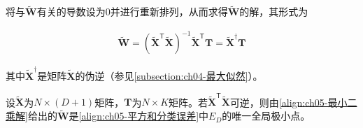 \documentclass[../../main.tex]{subfiles}
\begin{document}
将与$\tilde{\boldsymbol{W}}$有关的导数设为0并进行重新排列，从而求得$\tilde{\boldsymbol{W}}$的解，其形式为

\begin{align}
  \tilde{\boldsymbol{W}}=(\tilde{\boldsymbol{X}}^{\mathsf{T}}\tilde{\boldsymbol{X}})^{-1}\tilde{\boldsymbol{X}}^{\mathsf{T}}\boldsymbol{T}=\tilde{\boldsymbol{X}}^{\dagger}\boldsymbol{T}
  \label{align:ch05-最小二乘解}
\end{align}

其中$\tilde{\boldsymbol{X}}^{\dagger}$是矩阵$\tilde{\boldsymbol{X}}$的伪逆（参见\cref{subsection:ch04-最大似然}）。

\begin{proposition}[最小二乘分类解的极小性]\label{proposition:ch05-最小二乘极小性}
设$\tilde{\boldsymbol{X}}$为$N\times(D+1)$矩阵，$\boldsymbol{T}$为$N\times K$矩阵。若$\tilde{\boldsymbol{X}}^{\mathsf{T}}\tilde{\boldsymbol{X}}$可逆，则由\eqref{align:ch05-最小二乘解}给出的$\tilde{\boldsymbol{W}}$是\eqref{align:ch05-平方和分类误差}中$E_D$的唯一全局极小点。
\end{proposition}
\end{document}
